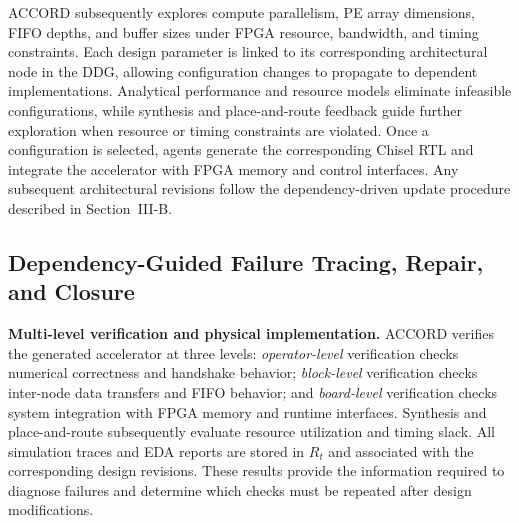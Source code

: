 \documentclass[9pt,conference]{IEEEtran}
\begin{document}
ACCORD subsequently explores compute parallelism, PE array dimensions, FIFO depths, and buffer sizes under FPGA resource, bandwidth, and timing constraints. Each design parameter is linked to its corresponding architectural node in the DDG, allowing configuration changes to propagate to dependent implementations. Analytical performance and resource models eliminate infeasible configurations, while synthesis and place-and-route feedback guide further exploration when resource or timing constraints are violated. Once a configuration is selected, agents generate the corresponding Chisel RTL and integrate the accelerator with FPGA memory and control interfaces. Any subsequent architectural revisions follow the dependency-driven update procedure described in Section~III-B.

\subsection{Dependency-Guided Failure Tracing, Repair, and Closure}
\textbf{Multi-level verification and physical implementation.}
ACCORD verifies the generated accelerator at three levels: \emph{operator-level} verification checks numerical correctness and handshake behavior; \emph{block-level} verification checks inter-node data transfers and FIFO behavior; and \emph{board-level} verification checks system integration with FPGA memory and runtime interfaces. Synthesis and place-and-route subsequently evaluate resource utilization and timing slack. All simulation traces and EDA reports are stored in $R_t$ and associated with the corresponding design revisions. These results provide the information required to diagnose failures and determine which checks must be repeated after design modifications.
\end{document}
